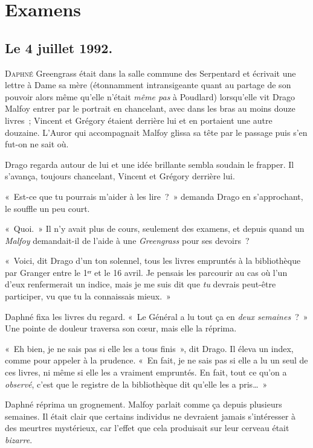 \chapter{Examens}

\section{Le 4 juillet 1992.}

\lettrine{D}{aphné} Greengrass était dans la salle commune des Serpentard et écrivait une lettre à Dame sa mère (étonnamment intransigeante quant au partage de son pouvoir alors même qu'elle n'était \emph{même pas} à Poudlard) lorsqu'elle vit Drago Malfoy entrer par le portrait en chancelant, avec dans les bras au moins douze livres~; Vincent et Grégory étaient derrière lui et en portaient une autre douzaine.
L'Auror qui accompagnait Malfoy glissa sa tête par le passage puis s'en fut-on ne sait où.

Drago regarda autour de lui et une idée brillante sembla soudain le frapper.
Il s'avança, toujours chancelant, Vincent et Grégory derrière lui.

«~Est-ce que tu pourrais m'aider à les lire~?~»
demanda Drago en s'approchant, le souffle un peu court.

«~Quoi.~» Il n'y avait plus de cours, seulement des examens, et depuis quand un \emph{Malfoy} demandait-il de l'aide à une \emph{Greengrass} pour ses devoirs~?

«~Voici, dit Drago d'un ton solennel, tous les livres empruntés à la bibliothèque par Granger entre le 1ᵉʳ et le 16 avril.
Je pensais les parcourir au cas où l'un d'eux renfermerait un indice, mais je me suis dit que \emph{tu} devrais peut-être participer, vu que tu la connaissais mieux.~»

Daphné fixa les livres du regard.
«~Le Général a lu tout ça en \emph{deux semaines}~?~»
Une pointe de douleur traversa son cœur, mais elle la réprima.

«~Eh bien, je ne sais pas si elle les a tous finis~», dit Drago.
Il éleva un index, comme pour appeler à la prudence.
«~En fait, je ne sais pas si elle a lu un seul de ces livres, ni même si elle les a vraiment empruntés.
En fait, tout ce qu'on a \emph{observé}, c'est que le registre de la bibliothèque dit qu'elle les a pris…~»

Daphné réprima un grognement.
Malfoy parlait comme ça depuis plusieurs semaines.
Il était clair que certains individus ne devraient jamais s'intéresser à des meurtres mystérieux, car l'effet que cela produisait sur leur cerveau était \emph{bizarre}.

